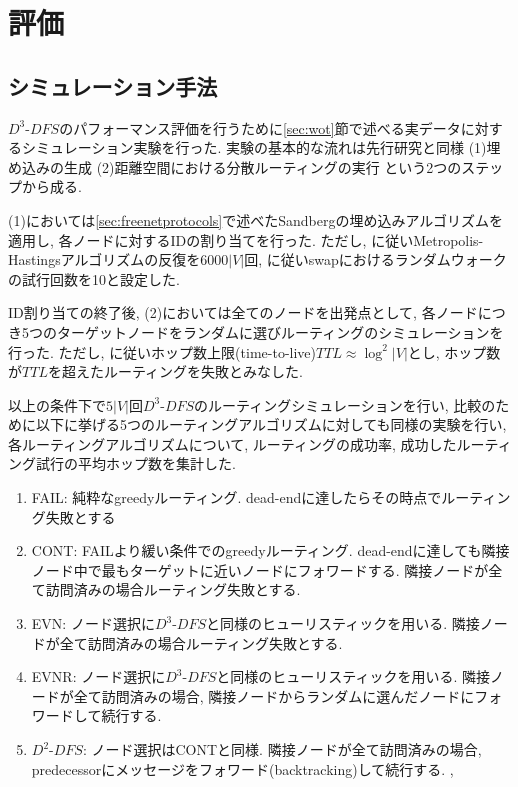 \documentclass[dvipdfmx]{ampbt}
\begin{document}
\section{評価}
  \subsection{シミュレーション手法}
  $D^3$-$DFS$のパフォーマンス評価を行うために\ref{sec:wot}節で述べる実データに対するシミュレーション実験を行った. 実験の基本的な流れは先行研究と同様 (1)埋め込みの生成 (2)距離空間における分散ルーティングの実行 という2つのステップから成る.

  (1)においては\ref{sec:freenetprotocols}で述べたSandbergの埋め込みアルゴリズムを適用し, 各ノードに対するIDの割り当てを行った. ただし, \cite{sandberg2006distributed}に従いMetropolis-Hastingsアルゴリズムの反復を$6000|V|$回, \cite{roos2016analyzing}に従い\gls{swap}におけるランダムウォークの試行回数を10と設定した.

  ID割り当ての終了後, (2)においては全てのノードを出発点として, 各ノードにつき5つのターゲットノードをランダムに選びルーティングのシミュレーションを行った. ただし\cite{sandberg2006distributed}, \cite{schiller2011attack}に従いホップ数上限(time-to-live)$TTL\approx \log^2|V|$とし, ホップ数が$TTL$を超えたルーティングを失敗とみなした.

  以上の条件下で$5|V|$回$D^3$-$DFS$のルーティングシミュレーションを行い, 比較のために以下に挙げる5つのルーティングアルゴリズムに対しても同様の実験を行い, 各ルーティングアルゴリズムについて, ルーティングの成功率, 成功したルーティング試行の平均ホップ数を集計した.

   \begin{enumerate}[label=(\alph*)]
    \item FAIL: 純粋なgreedyルーティング. dead-endに達したらその時点でルーティング失敗とする\cite{sandberg2006distributed}
    \item CONT: FAILより緩い条件でのgreedyルーティング. dead-endに達しても隣接ノード中で最もターゲットに近いノードにフォワードする. 隣接ノードが全て訪問済みの場合ルーティング失敗とする. \cite{sandberg2006distributed}
    \item EVN: ノード選択に$D^3$-$DFS$と同様のヒューリスティックを用いる. 隣接ノードが全て訪問済みの場合ルーティング失敗とする. 
    \item EVNR: ノード選択に$D^3$-$DFS$と同様のヒューリスティックを用いる. 隣接ノードが全て訪問済みの場合, 隣接ノードからランダムに選んだノードにフォワードして続行する. \cite{simsek2008navigating}
    \item $D^2$-$DFS$: ノード選択はCONTと同様. 隣接ノードが全て訪問済みの場合, predecessorにメッセージをフォワード(backtracking)して続行する. \cite{clarke2001freenet}, \cite{clarke2010private}
   \end{enumerate}
\end{document}
